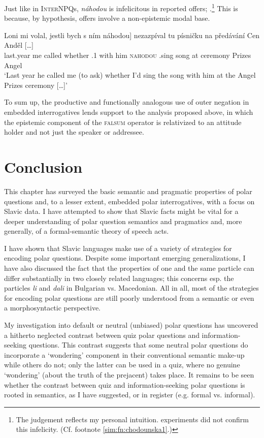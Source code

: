 \documentclass[output=paper,colorlinks,citecolor=brown]{langscibook}
\begin{document}
Just like in \textsc{InterNPQ}s, \textit{náhodou} is infelicitous in reported offers; .\footnote{The judgement reflects my personal intuition.  experiments did not confirm this infelicity. (Cf. footnote \ref{sim:fn:chodounska1}.)} This is because, by hypothesis, offers involve a non-epistemic modal base.

\ea\gll Loni mi volal, jestli bych s ním \minsp{[\#} náhodou] nezazpíval tu písničku na předávání Cen Anděl [\dots]\label{sim:ex:offer-emb}\\
last.year me called whether {\SBJV}.1{\SG} with him {} \textsc{nahodou} {\NEG}.sing {\DEM} song at ceremony Prizes Angel\\
\glt `Last year he called me (to ask) whether I'd sing the song with him at the Angel Prizes ceremony [\dots]'
\z

\noindent To sum up, the productive and functionally analogous use of outer negation in embedded interrogatives lends support to the analysis proposed above, in which the epistemic component of the \textsc{falsum} operator is relativized to an attitude holder and not just the speaker or addressee.

\section{Conclusion}\label{sim:sec:concl}

This chapter has surveyed the basic semantic and pragmatic properties of polar questions and, to a lesser extent, embedded polar interrogatives, with a focus on Slavic data. I have attempted to show that Slavic facts might be vital for a deeper understanding of polar question semantics and pragmatics and, more generally, of a formal-semantic theory of speech acts.

I have shown that Slavic languages make use of a variety of strategies for encoding polar questions. Despite some important emerging generalizations, I have also discussed the fact that the properties of one and the same particle can differ substantially in two closely related languages; this concerns esp. the particles \textit{li} and \textit{dali} in Bulgarian vs. Macedonian. All in all, most of the strategies for encoding polar questions are still poorly understood from a semantic or even a morphosyntactic perspective. 

My investigation into default or neutral (unbiased) polar questions has uncovered a hitherto neglected contrast between quiz polar questions and information-seeking questions. This contrast suggests that some neutral polar questions do incorporate a `wondering' component in their conventional semantic make-up while others do not; only the latter can be used in a quiz, where no genuine `wondering' (about the truth of the prejacent) takes place. It remains to be seen whether the contrast between quiz and information-seeking polar questions is rooted in semantics, as I have suggested, or in register (e.g. formal vs. informal).
\end{document}
